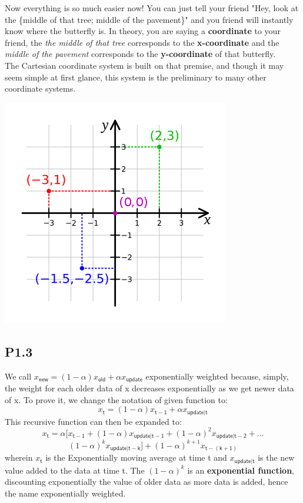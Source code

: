 \documentclass[12pt]{article}
\begin{document}
Now everything is so much easier now! You can just tell your friend "Hey, look at the \{middle of that tree; middle of the pavement\}" and you friend will instantly know where the butterfly is. In theory, you are saying a \textbf{coordinate} to your friend, the \textit{the middle of that tree} corresponds to the \textbf{x-coordinate} and the \textit{middle of the pavement} corresponds to the \textbf{y-coordinate} of that butterfly.\\
The Cartesian coordinate system is built on that premise, and though it may seem simple at first glance, this system is the preliminary to many other coordinate systems. 

\begin{center}
\includegraphics[scale=0.5]{3}
\end{center}

\subsection*{P1.3}
We call $x_\mathsf{new} = (1-\alpha)  x_\mathsf{old}+\alpha x_\mathsf{update}$ exponentially weighted because, simply, the weight for each older data of x decreases exponentially as we get newer data of x. To prove it, we change the notation of given function to: $$x_\mathsf{t} = (1-\alpha)  x_\mathsf{t-1}+\alpha x_\mathsf{update|t}$$
This recursive function can then be expanded to: $$x_\mathsf{t} = \alpha[x_\mathsf{t-1} +(1-\alpha)x_\mathsf{update|t-1} + (1-\alpha)^2x_\mathsf{update|t-2} + \ldots $$ 
$$ (1-\alpha)^kx_\mathsf{update|t-k}]+(1-\alpha)^{k+1}x_\mathsf{t-(k+1)}$$
wherein $x_\mathsf{t}$ is the Exponentially moving average at time t and $x_\mathsf{update|t}$ is the new value added to the data at time t. The $(1-\alpha)^k$ is an \textbf{exponential function}, discounting exponentially the value of older data as more data is added, hence the name exponentially weighted.
\end{document}
